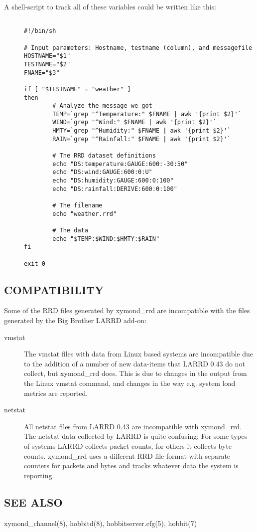  A shell-script to track all of these variables could be written like this: \begin{description}
\item[]\begin{verbatim}

#!/bin/sh

# Input parameters: Hostname, testname (column), and messagefile
HOSTNAME="$1"
TESTNAME="$2"
FNAME="$3"

if [ "$TESTNAME" = "weather" ]
then
        # Analyze the message we got
        TEMP=`grep "^Temperature:" $FNAME | awk '{print $2}'`
        WIND=`grep "^Wind:" $FNAME | awk '{print $2}'`
        HMTY=`grep "^Humidity:" $FNAME | awk '{print $2}'`
        RAIN=`grep "^Rainfall:" $FNAME | awk '{print $2}'`

        # The RRD dataset definitions
        echo "DS:temperature:GAUGE:600:-30:50"
        echo "DS:wind:GAUGE:600:0:U"
        echo "DS:humidity:GAUGE:600:0:100"
        echo "DS:rainfall:DERIVE:600:0:100"

        # The filename
        echo "weather.rrd"

        # The data
        echo "$TEMP:$WIND:$HMTY:$RAIN"
fi

exit 0

\end{verbatim}


 


 


\end{description}

\subsection{COMPATIBILITY}


  Some of the RRD files generated by xymond\_rrd are incompatible
  with the files generated by the Big Brother LARRD add-on: 



\begin{description}

\item[vmstat] The vmstat files with data from Linux based systems are
  incompatible due to the addition of a number of new data-items that
  LARRD 0.43 do not collect, but xymond\_rrd does. This is due to
  changes in the output from the Linux vmstat command, and changes in
  the way e.g. system load metrics are reported. 
 

\item[netstat] All netstat files from LARRD 0.43 are incompatible with
  xymond\_rrd. The netstat data collected by LARRD is quite
  confusing: For some types of systems LARRD collects packet-counts,
  for others it collects byte- counts. xymond\_rrd uses a different
  RRD file-format with separate counters for packets and bytes and
  tracks whatever data the system is reporting. 


 


 


\end{description}

\subsection{SEE ALSO}
xymond\_channel(8), hobbitd(8), hobbitserver.cfg(5), hobbit(7) 

